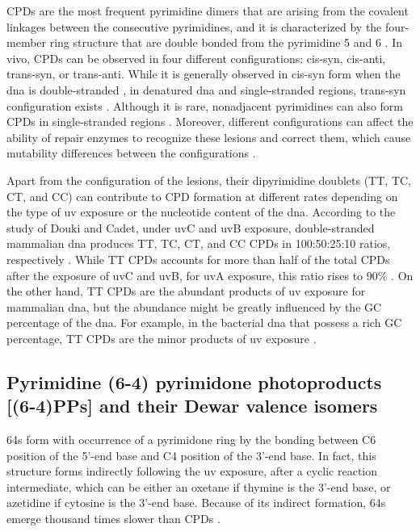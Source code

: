 \gls{CPD}s are the most frequent pyrimidine dimers that are arising from the covalent linkages between the consecutive pyrimidines, and it is characterized by the four-member ring structure that are double bonded from the pyrimidine 5 and 6 \citep{whitmore2001effect}. In vivo, \gls{CPD}s can be observed in four different configurations: cis-syn, cis-anti, trans-syn, or trans-anti. \citep{khattak1972photochemical} While it is generally observed in cis-syn form when the \gls{dna} is double-stranded \citep{wacker1964organic}, in denatured \gls{dna} and single-stranded regions, trans-syn configuration exists \citep{taylor1988synthesis}. Although it is rare, nonadjacent pyrimidines can also form \gls{CPD}s in single-stranded regions \citep{nguyen1988ultraviolet}. Moreover, different configurations can affect the ability of repair enzymes to recognize these lesions and correct them, which cause mutability differences between the configurations \citep{friedberg2005dna}. 

Apart from the configuration of the lesions, their dipyrimidine doublets (\gls{T}\gls{T}, \gls{T}\gls{C}, \gls{C}\gls{T}, and \gls{C}\gls{C}) can contribute to \gls{CPD} formation at different rates depending on the type of \gls{uv} exposure or the nucleotide content of the \gls{dna}. According to the study of Douki and Cadet, under \gls{uv}C and \gls{uv}B exposure, double-stranded mammalian \gls{dna} produces \gls{T}\gls{T}, \gls{T}\gls{C}, \gls{C}\gls{T}, and \gls{C}\gls{C} \gls{CPD}s in 100:50:25:10 ratios, respectively \citep{douki2001individual}. While \gls{T}\gls{T} \gls{CPD}s accounts for more than half of the total \gls{CPD}s after the exposure of \gls{uv}C and \gls{uv}B, for \gls{uv}A exposure, this ratio rises to 90\% \citep{mouret2010uva}. On the other hand, \gls{T}\gls{T} \gls{CPD}s are the abundant products of \gls{uv} exposure for mammalian \gls{dna}, but the abundance might be greatly influenced by the \gls{G}\gls{C} percentage of the \gls{dna}. For example, in the bacterial \gls{dna} that possess a rich \gls{G}\gls{C} percentage, \gls{T}\gls{T} \gls{CPD}s are the minor products of \gls{uv} exposure \citep{patrick1977studies}.

\subsection{Pyrimidine (6-4) pyrimidone photoproducts [(6-4)PPs] and their Dewar valence isomers}

\gls{64}s form with occurrence of a pyrimidone ring by the bonding between C6 position of the 5’-end base and C4 position of the 3’-end base. In fact, this structure forms indirectly following the \gls{uv} exposure, after a cyclic reaction intermediate, which can be either an oxetane if thymine is the 3’-end base, or azetidine if cytosine is the 3’-end base. Because of its indirect formation, \gls{64}s emerge thousand times slower than \gls{CPD}s \citep{schreier2007thymine}. 

